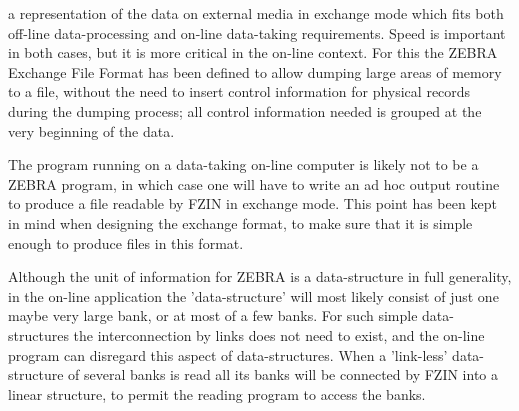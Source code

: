 a representation of the data on external media in exchange mode
which fits both off-line data-processing and on-line data-taking
requirements.
Speed is important in both cases, but it is more critical in the
on-line context.
For this the ZEBRA Exchange File Format has been defined to allow
dumping large areas of memory to a file,
without the need  to insert control information  for physical
records during the dumping process;
all control information needed is grouped at the very beginning
of the data.
\par
The program running on a data-taking on-line computer is
likely not to be a ZEBRA program,
in which case one will have to write an ad hoc output routine to
produce a file readable by FZIN in exchange mode.
This point has been kept in mind when designing the exchange format,
to make sure that it is simple enough
to produce files in this format.
\par
Although the unit of information for ZEBRA is a data-structure
in full generality,
in the on-line application the
'data-structure' will most likely consist of just one maybe
very large bank,
or at most of a few banks.
For such simple data-structures the interconnection
by links does not need to exist,
and the on-line program can disregard this aspect of
data-structures.
When a 'link-less' data-structure of several banks is read
all its banks will be connected by FZIN into
a linear structure, to permit the reading program to access
the banks.
